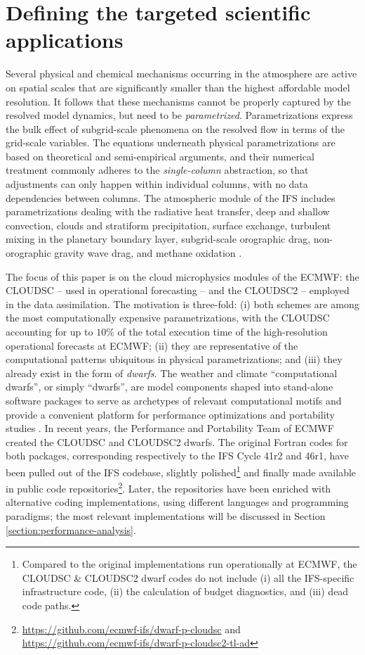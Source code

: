 \documentclass[main.tex]{subfiles}
\begin{document}
    \justifying

    \section{Defining the targeted scientific applications}
    \label{section:target-cloud-microphysics-schemes}

        Several physical and chemical mechanisms occurring in the atmosphere are active on spatial scales that are significantly smaller than the highest affordable model resolution. It follows that these mechanisms cannot be properly captured by the resolved model dynamics, but need to be \emph{parametrized}. Parametrizations express the bulk effect of subgrid-scale phenomena on the resolved flow in terms of the grid-scale variables. The equations underneath physical parametrizations are based on theoretical and semi-empirical arguments, and their numerical treatment commonly adheres to the \emph{single-column} abstraction, so that adjustments can only happen within individual columns, with no data dependencies between columns. The atmospheric module of the IFS includes parametrizations dealing with the radiative heat transfer, deep and shallow convection, clouds and stratiform precipitation, surface exchange, turbulent mixing in the planetary boundary layer, subgrid-scale orographic drag, non-orographic gravity wave drag, and methane oxidation \citep{ifs48r1}.

        The focus of this paper is on the cloud microphysics modules of the ECMWF: the CLOUDSC -- used in operational forecasting -- and the CLOUDSC2 -- employed in the data assimilation. The motivation is three-fold: (i) both schemes are among the most computationally expensive parametrizations, with the CLOUDSC accounting for up to $10\%$ of the total execution time of the high-resolution operational forecasts at ECMWF; (ii) they are representative of the computational patterns ubiquitous in physical parametrizations; and (iii) they already exist in the form of \emph{dwarfs}. The weather and climate ``computational dwarfs'', or simply ``dwarfs'', are model components shaped into stand-alone software packages to serve as archetypes of relevant computational motifs \citep{muller19} and provide a convenient platform for performance optimizations and portability studies \citep{bauer20}. In recent years, the Performance and Portability Team of ECMWF created the CLOUDSC and CLOUDSC2 dwarfs. The original Fortran codes for both packages, corresponding respectively to the IFS Cycle 41r2 and 46r1, have been pulled out of the IFS codebase, slightly polished\footnote{Compared to the original implementations run operationally at ECMWF, the CLOUDSC \& CLOUDSC2 dwarf codes do not include (i) all the IFS-specific infrastructure code, (ii) the calculation of budget diagnostics, and (iii) dead code paths.} and finally made available in public code repositories\footnote{\url{https://github.com/ecmwf-ifs/dwarf-p-cloudsc} and \url{https://github.com/ecmwf-ifs/dwarf-p-cloudsc2-tl-ad}}. Later, the repositories have been enriched with alternative coding implementations, using different languages and programming paradigms; the most relevant implementations will be discussed in Section \ref{section:performance-analysis}.
\end{document}
